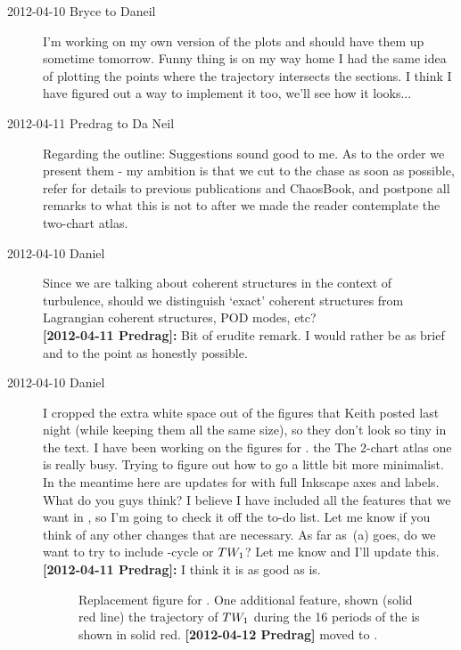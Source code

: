 \begin{description}
\item[2012-04-10 Bryce to Daneil] I'm working on my own version of the
plots and should have them up sometime tomorrow. Funny thing is on my way
home I had the same idea of plotting the points where the trajectory
intersects the sections. I think I have figured out a way to implement it
too, we'll see how it looks...

\item[2012-04-11 Predrag to Da Neil] Regarding the outline: Suggestions
sound good to me. As to the order we present them - my ambition is that
we cut to the chase as soon as possible, refer for details to previous
publications and ChaosBook, and postpone all remarks to what this is not
to after we made the reader contemplate the two-chart atlas.

\item[2012-04-10 Daniel]
    Since we are talking about coherent structures in the context
    of turbulence, should we distinguish `exact' coherent structures from
    Lagrangian coherent structures, POD modes, etc?
 \\
{\bf [2012-04-11 Predrag]: } Bit of erudite remark. I would rather be as
brief and to the point as honestly possible.

\item[2012-04-10 Daniel] I cropped the extra white space out of the
figures that Keith posted last night (while keeping them all the same
size), so they don't look so tiny in the text. I have been working on the
figures for \cLf. the The 2-chart atlas one is really busy. Trying to
figure out how to go a little bit more minimalist. In the meantime here
are updates for 
with full Inkscape axes and labels. What do you guys think? I believe I
have included all the features that we want in , so
I'm going to check it off the to-do list. Let me know if you think of any
other changes that are necessary. As far as \,(a)
goes, do we want to try to include -cycle or $TW_{1}$? Let
me know and I'll update this. \\
{\bf [2012-04-11 Predrag]: } I think it is as good as is.


\begin{figure}
  \caption{\label{fig:CLEWurst}
  Replacement figure for . One additional feature,
  shown (solid red line) the trajectory of $TW_{1}$ during the 16
  periods of the \rpo is shown in solid red.
  {\bf [2012-04-12 Predrag]} moved to .
  }
\end{figure}


\end{description}
